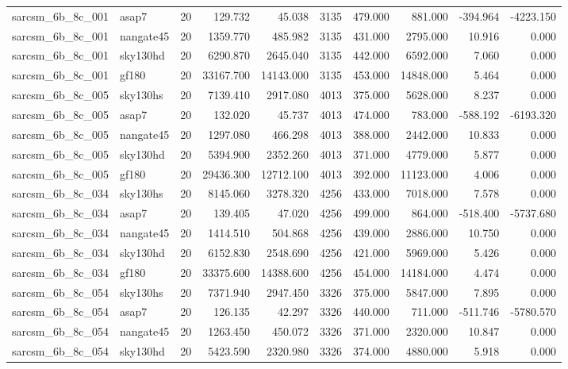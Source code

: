 \begin{longtable}{llrrrrrrrr}
sarcsm\_6b\_8c\_001 & asap7 & 20 & 129.732 & 45.038 & 3135 & 479.000 & 881.000 & -394.964 & -4223.150 \\
sarcsm\_6b\_8c\_001 & nangate45 & 20 & 1359.770 & 485.982 & 3135 & 431.000 & 2795.000 & 10.916 & 0.000 \\
sarcsm\_6b\_8c\_001 & sky130hd & 20 & 6290.870 & 2645.040 & 3135 & 442.000 & 6592.000 & 7.060 & 0.000 \\
sarcsm\_6b\_8c\_001 & gf180 & 20 & 33167.700 & 14143.000 & 3135 & 453.000 & 14848.000 & 5.464 & 0.000 \\
sarcsm\_6b\_8c\_005 & sky130hs & 20 & 7139.410 & 2917.080 & 4013 & 375.000 & 5628.000 & 8.237 & 0.000 \\
sarcsm\_6b\_8c\_005 & asap7 & 20 & 132.020 & 45.737 & 4013 & 474.000 & 783.000 & -588.192 & -6193.320 \\
sarcsm\_6b\_8c\_005 & nangate45 & 20 & 1297.080 & 466.298 & 4013 & 388.000 & 2442.000 & 10.833 & 0.000 \\
sarcsm\_6b\_8c\_005 & sky130hd & 20 & 5394.900 & 2352.260 & 4013 & 371.000 & 4779.000 & 5.877 & 0.000 \\
sarcsm\_6b\_8c\_005 & gf180 & 20 & 29436.300 & 12712.100 & 4013 & 392.000 & 11123.000 & 4.006 & 0.000 \\
sarcsm\_6b\_8c\_034 & sky130hs & 20 & 8145.060 & 3278.320 & 4256 & 433.000 & 7018.000 & 7.578 & 0.000 \\
sarcsm\_6b\_8c\_034 & asap7 & 20 & 139.405 & 47.020 & 4256 & 499.000 & 864.000 & -518.400 & -5737.680 \\
sarcsm\_6b\_8c\_034 & nangate45 & 20 & 1414.510 & 504.868 & 4256 & 439.000 & 2886.000 & 10.750 & 0.000 \\
sarcsm\_6b\_8c\_034 & sky130hd & 20 & 6152.830 & 2548.690 & 4256 & 421.000 & 5969.000 & 5.426 & 0.000 \\
sarcsm\_6b\_8c\_034 & gf180 & 20 & 33375.600 & 14388.600 & 4256 & 454.000 & 14184.000 & 4.474 & 0.000 \\
sarcsm\_6b\_8c\_054 & sky130hs & 20 & 7371.940 & 2947.450 & 3326 & 375.000 & 5847.000 & 7.895 & 0.000 \\
sarcsm\_6b\_8c\_054 & asap7 & 20 & 126.135 & 42.297 & 3326 & 440.000 & 711.000 & -511.746 & -5780.570 \\
sarcsm\_6b\_8c\_054 & nangate45 & 20 & 1263.450 & 450.072 & 3326 & 371.000 & 2320.000 & 10.847 & 0.000 \\
sarcsm\_6b\_8c\_054 & sky130hd & 20 & 5423.590 & 2320.980 & 3326 & 374.000 & 4880.000 & 5.918 & 0.000 \\

\end{longtable}

